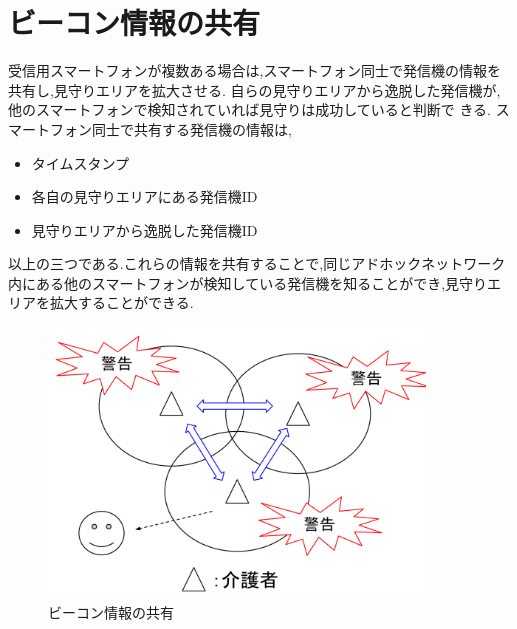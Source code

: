 \section{ビーコン情報の共有}
受信用スマートフォンが複数ある場合は,スマートフォン同士で発信機の情報を共有し,見守りエリアを拡大させる.
自らの見守りエリアから逸脱した発信機が,他のスマートフォンで検知されていれば見守りは成功していると判断で
きる.
スマートフォン同士で共有する発信機の情報は,

\begin{itemize}
\item タイムスタンプ
\item 各自の見守りエリアにある発信機ID
\item 見守りエリアから逸脱した発信機ID
\end{itemize}

以上の三つである.これらの情報を共有することで,同じアドホックネットワーク内にある他のスマートフォンが検知している発信機を知ることができ,見守りエリアを拡大することができる.

\begin{figure}[htbp]
\centering
\includegraphics[width=10cm]{fig/share.pdf}
\caption{ビーコン情報の共有}
\end{figure}
